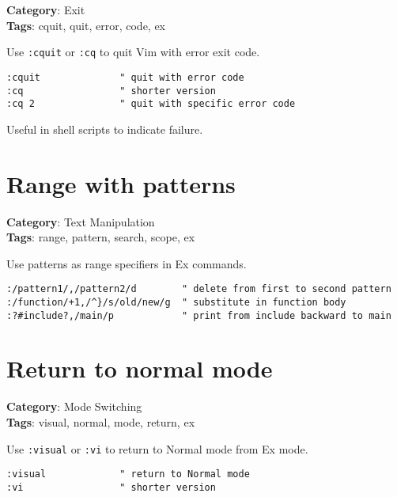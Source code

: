 {{{{\textbf{Category}: Exit\\ \textbf{Tags}: cquit, quit, error, code, ex
\vspace{0.5cm}

Use {\footnotesize \Verb§:cquit§} or {\footnotesize \Verb§:cq§} to quit Vim with error exit code.

\begin{Exa*}{}
\begin{Verbatim}[fontsize=\footnotesize, breaklines, breakanywhere]
:cquit              " quit with error code
:cq                 " shorter version  
:cq 2               " quit with specific error code
\end{Verbatim}
\end{Exa*}

Useful in shell scripts to indicate failure.

\section{Range with patterns}

\textbf{Category}: Text Manipulation\\ \textbf{Tags}: range, pattern, search, scope, ex
\vspace{0.5cm}

Use patterns as range specifiers in Ex commands.

\begin{Exa*}{}
\begin{Verbatim}[fontsize=\footnotesize, breaklines, breakanywhere]
:/pattern1/,/pattern2/d        " delete from first to second pattern
:/function/+1,/^}/s/old/new/g  " substitute in function body
:?#include?,/main/p            " print from include backward to main
\end{Verbatim}
\end{Exa*}

\section{Return to normal mode}

\textbf{Category}: Mode Switching\\ \textbf{Tags}: visual, normal, mode, return, ex
\vspace{0.5cm}

Use {\footnotesize \Verb§:visual§} or {\footnotesize \Verb§:vi§} to return to Normal mode from Ex mode.

\begin{Exa*}{}
\begin{Verbatim}[fontsize=\footnotesize, breaklines, breakanywhere]
:visual             " return to Normal mode
:vi                 " shorter version
\end{Verbatim}
\end{Exa*}

}}}}
